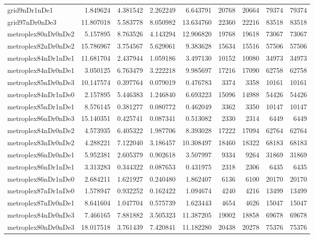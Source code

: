 \begin{longtable}{|l|r|r|r|r|r|r|r|r|}
grid9nDr1nDe1 & 1.849624 & 4.381542 & 2.262249 & 6.643791 & 20768 & 20664 & 79374 & 79374 \\
grid97nDr0nDe3 & 11.807018 & 5.583778 & 8.050982 & 13.634760 & 22360 & 22216 & 83518 & 83518 \\
metroplex80nDr0nDe2 & 5.157895 & 8.763526 & 4.143294 & 12.906820 & 19768 & 19618 & 73067 & 73067 \\
metroplex82nDr0nDe2 & 15.786967 & 3.754567 & 5.629061 & 9.383628 & 15634 & 15516 & 57506 & 57506 \\
metroplex84nDr1nDe1 & 11.681704 & 2.437944 & 1.059186 & 3.497130 & 10152 & 10080 & 34973 & 34973 \\
metroplex84nDr0nDe1 & 3.050125 & 6.763479 & 3.222218 & 9.985697 & 17216 & 17090 & 62758 & 62758 \\
metroplex85nDr0nDe3 & 10.147574 & 0.397764 & 0.079019 & 0.476783 & 3374 & 3358 & 10161 & 10161 \\
metroplex84nDr1nDe0 & 2.157895 & 5.446383 & 1.246840 & 6.693223 & 15096 & 14988 & 54426 & 54426 \\
metroplex85nDr1nDe1 & 8.576145 & 0.381277 & 0.080772 & 0.462049 & 3362 & 3350 & 10147 & 10147 \\
metroplex86nDr0nDe3 & 15.140351 & 0.425741 & 0.087341 & 0.513082 & 2330 & 2314 & 6449 & 6449 \\
metroplex84nDr0nDe2 & 4.573935 & 6.405322 & 1.987706 & 8.393028 & 17222 & 17094 & 62764 & 62764 \\
metroplex83nDr0nDe2 & 4.288221 & 7.122040 & 3.186457 & 10.308497 & 18460 & 18322 & 68183 & 68183 \\
metroplex86nDr0nDe1 & 5.952381 & 2.605379 & 0.902618 & 3.507997 & 9334 & 9264 & 31869 & 31869 \\
metroplex86nDr1nDe1 & 3.313283 & 0.344322 & 0.087653 & 0.431975 & 2318 & 2306 & 6435 & 6435 \\
metroplex86nDr1nDe0 & 2.684211 & 1.621927 & 0.240480 & 1.862407 & 6136 & 6100 & 20170 & 20170 \\
metroplex87nDr1nDe0 & 1.578947 & 0.932252 & 0.162422 & 1.094674 & 4240 & 4216 & 13499 & 13499 \\
metroplex87nDr0nDe1 & 8.641604 & 1.047704 & 0.575739 & 1.623443 & 4654 & 4626 & 15047 & 15047 \\
metroplex84nDr0nDe3 & 7.466165 & 7.881882 & 3.505323 & 11.387205 & 19002 & 18858 & 69678 & 69678 \\
metroplex80nDr0nDe3 & 18.017518 & 3.761439 & 7.420841 & 11.182280 & 20438 & 20278 & 75376 & 75376 \\

\end{longtable}
